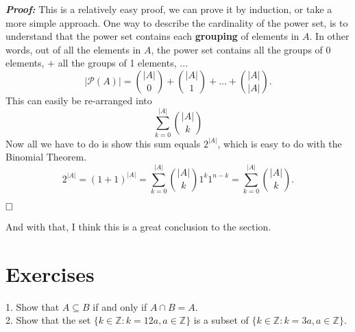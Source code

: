 \documentclass{report}
\begin{document}
\textbf{\textit{Proof:}} This is a relatively easy proof, we can prove it by induction, or take a more simple approach. One way to describe the cardinality of the power set, is to understand
that the power set contains each \textbf{grouping} of elements in $A$. In other words, out of all the elements in $A$, the power set contains all the groups of 0 elements, $+$ all the groups of 1 elements, $\dots$
$$|\mathcal{P}(A)| = {|A| \choose 0} + {|A| \choose 1} + \dots + {|A| \choose |A|}.$$
This can easily be re-arranged into $$\sum_{k=0}^{|A|}{|A| \choose k}$$
Now all we have to do is show this sum equals $2^{|A|}$, which is easy to do with the Binomial Theorem.
$$2^{|A|} = (1 + 1)^{|A|} = \sum_{k = 0}^{|A|}{|A| \choose k} 1^k 1^{n-k} = \sum_{k = 0}^{|A|}{|A| \choose k}.$$

$\hfill \square$

And with that, I think this is a great conclusion to the section.

\section*{Exercises}
1. Show that $A \subseteq B$ if and only if $A \cap B = A$. \\
2. Show that the set $\{k \in \mathbb{Z} : k = 12a, a \in \mathbb{Z}\}$ is a subset of $\{k \in \mathbb{Z} : k = 3a, a \in \mathbb{Z}\}$.\\
\end{document}

